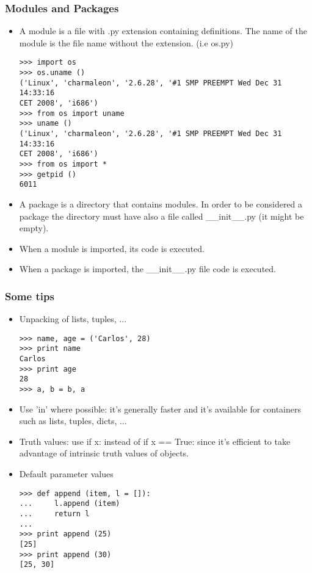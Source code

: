 \begin{frame}[fragile]
  \frametitle{Modules and Packages}
  \begin{itemize}
  \item A module is a file with .py extension containing
    definitions. The name of the module is the file name without the
    extension. (i.e os.py)
{\scriptsize
\begin{verbatim}
>>> import os
>>> os.uname ()
('Linux', 'charmaleon', '2.6.28', '#1 SMP PREEMPT Wed Dec 31 14:33:16
CET 2008', 'i686')
>>> from os import uname
>>> uname ()
('Linux', 'charmaleon', '2.6.28', '#1 SMP PREEMPT Wed Dec 31 14:33:16
CET 2008', 'i686')
>>> from os import *
>>> getpid ()
6011
\end{verbatim}
}

\item A package is a directory that contains modules. In order to be
  considered a package the directory must have also a file called
  \_\_init\_\_.py (it might be empty). 

\item When a module is imported, its code is executed.
\item When a package is imported, the \_\_init\_\_.py file code is
  executed. 
\end{itemize}

\end{frame}

\begin{frame}[fragile]
  \frametitle{Some tips}

  \begin{itemize}
  \item Unpacking of lists, tuples, ...
{\scriptsize
\begin{verbatim}
>>> name, age = ('Carlos', 28)
>>> print name
Carlos
>>> print age
28
>>> a, b = b, a
\end{verbatim}
}

\item Use 'in' where possible: it's generally faster and it's available for
  containers such as lists, tuples, dicts, ...

\item Truth values: use if x: instead of if x == True: since it's
  efficient to take advantage of intrinsic truth values of objects.

\item Default parameter values
{\scriptsize
\begin{verbatim}
>>> def append (item, l = []):
...     l.append (item)
...     return l
... 
>>> print append (25)
[25]
>>> print append (30)
[25, 30]
\end{verbatim}
}
\end{itemize}
\end{frame}


